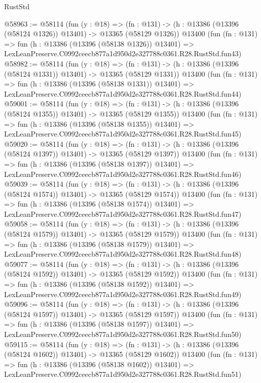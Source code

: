 \begin{lexlean}{RustStd}
\begin{coremodule}
@58963 := @58114
    (fun (y : @18) =>
    (fn : @131) -> (h : @13386 (@13396 (@58124 @1326)) @13401) -> @13365 (@58129 @1326))
    @13400
    (fun (fn : @131) =>
    fun (h : @13386 (@13396 (@58138 @1326)) @13401) =>
    LexLeanPreserve.C0992ceecb877a1d950d2e327788c0361.R28.RustStd.fun43)
@58982 := @58114
    (fun (y : @18) =>
    (fn : @131) -> (h : @13386 (@13396 (@58124 @1331)) @13401) -> @13365 (@58129 @1331))
    @13400
    (fun (fn : @131) =>
    fun (h : @13386 (@13396 (@58138 @1331)) @13401) =>
    LexLeanPreserve.C0992ceecb877a1d950d2e327788c0361.R28.RustStd.fun44)
@59001 := @58114
    (fun (y : @18) =>
    (fn : @131) -> (h : @13386 (@13396 (@58124 @1355)) @13401) -> @13365 (@58129 @1355))
    @13400
    (fun (fn : @131) =>
    fun (h : @13386 (@13396 (@58138 @1355)) @13401) =>
    LexLeanPreserve.C0992ceecb877a1d950d2e327788c0361.R28.RustStd.fun45)
@59020 := @58114
    (fun (y : @18) =>
    (fn : @131) -> (h : @13386 (@13396 (@58124 @1397)) @13401) -> @13365 (@58129 @1397))
    @13400
    (fun (fn : @131) =>
    fun (h : @13386 (@13396 (@58138 @1397)) @13401) =>
    LexLeanPreserve.C0992ceecb877a1d950d2e327788c0361.R28.RustStd.fun46)
@59039 := @58114
    (fun (y : @18) =>
    (fn : @131) -> (h : @13386 (@13396 (@58124 @1574)) @13401) -> @13365 (@58129 @1574))
    @13400
    (fun (fn : @131) =>
    fun (h : @13386 (@13396 (@58138 @1574)) @13401) =>
    LexLeanPreserve.C0992ceecb877a1d950d2e327788c0361.R28.RustStd.fun47)
@59058 := @58114
    (fun (y : @18) =>
    (fn : @131) -> (h : @13386 (@13396 (@58124 @1579)) @13401) -> @13365 (@58129 @1579))
    @13400
    (fun (fn : @131) =>
    fun (h : @13386 (@13396 (@58138 @1579)) @13401) =>
    LexLeanPreserve.C0992ceecb877a1d950d2e327788c0361.R28.RustStd.fun48)
@59077 := @58114
    (fun (y : @18) =>
    (fn : @131) -> (h : @13386 (@13396 (@58124 @1592)) @13401) -> @13365 (@58129 @1592))
    @13400
    (fun (fn : @131) =>
    fun (h : @13386 (@13396 (@58138 @1592)) @13401) =>
    LexLeanPreserve.C0992ceecb877a1d950d2e327788c0361.R28.RustStd.fun49)
@59096 := @58114
    (fun (y : @18) =>
    (fn : @131) -> (h : @13386 (@13396 (@58124 @1597)) @13401) -> @13365 (@58129 @1597))
    @13400
    (fun (fn : @131) =>
    fun (h : @13386 (@13396 (@58138 @1597)) @13401) =>
    LexLeanPreserve.C0992ceecb877a1d950d2e327788c0361.R28.RustStd.fun50)
@59115 := @58114
    (fun (y : @18) =>
    (fn : @131) -> (h : @13386 (@13396 (@58124 @1602)) @13401) -> @13365 (@58129 @1602))
    @13400
    (fun (fn : @131) =>
    fun (h : @13386 (@13396 (@58138 @1602)) @13401) =>
    LexLeanPreserve.C0992ceecb877a1d950d2e327788c0361.R28.RustStd.fun51)

\end{coremodule}
\end{lexlean}
